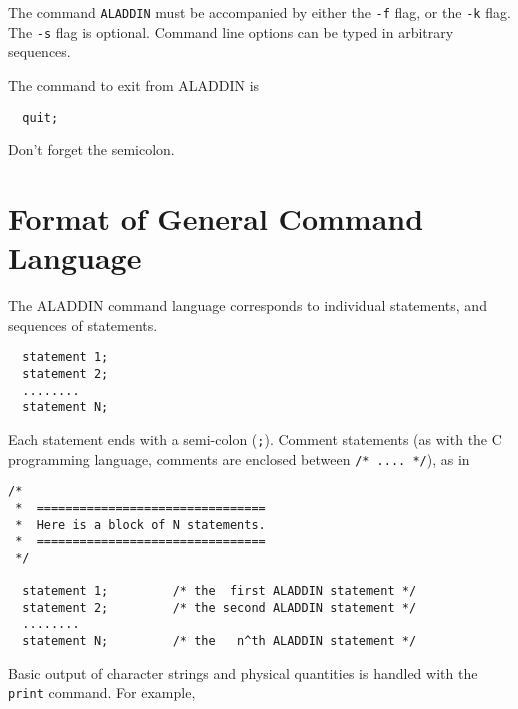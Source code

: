 \vspace{0.15 in}\noindent
The command {\tt ALADDIN} must be accompanied by
either the {\tt -f} flag, or the {\tt -k} flag.
The {\tt -s} flag is optional.
Command line options can be typed in arbitrary sequences.

\vspace{0.15 in}\noindent
The command to exit from ALADDIN is 

\begin{footnotesize}
\begin{verbatim}
  quit;
\end{verbatim}
\end{footnotesize}

\vspace{0.15 in}\noindent
Don't forget the semicolon.

\section{Format of General Command Language}

\vspace{0.15 in}
\noindent\hspace{0.50 in}
The ALADDIN command language corresponds to individual
statements, and sequences of statements.

\begin{footnotesize}
\begin{verbatim}
  statement 1;    
  statement 2;    
  ........
  statement N;
\end{verbatim}
\end{footnotesize}

\vspace{0.15 in}\noindent
Each statement ends with a semi-colon ({\tt ;}). 
Comment statements (as with the C programming language,
comments are enclosed between {\tt /* .... */}), as in

\begin{footnotesize}
\begin{verbatim}
/*
 *  ================================
 *  Here is a block of N statements.
 *  ================================
 */

  statement 1;         /* the  first ALADDIN statement */
  statement 2;         /* the second ALADDIN statement */
  ........
  statement N;         /* the   n^th ALADDIN statement */
\end{verbatim}
\end{footnotesize}

\vspace{0.15 in}\noindent
Basic output of character strings and physical quantities is handled with
the {\tt print} command. For example,

